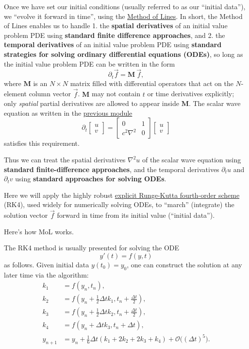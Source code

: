 \documentclass[landscape,letterpaper,10pt,english]{article}
\begin{document}
Once we have set our initial conditions (usually referred to as our
``initial data''), we ``evolve it forward in time'', using the
\href{https://reference.wolfram.com/language/tutorial/NDSolveMethodOfLines.html}{Method
of Lines}. In short, the Method of Lines enables us to handle 1. the
\textbf{spatial derivatives} of an initial value problem PDE using
\textbf{standard finite difference approaches}, and 2. the
\textbf{temporal derivatives} of an initial value problem PDE using
\textbf{standard strategies for solving ordinary differential equations
(ODEs)}, so long as the initial value problem PDE can be written in the
form \[\partial_t \vec{f} = \mathbf{M}\ \vec{f},\] where \(\mathbf{M}\)
is an \(N\times N\) matrix filled with differential operators that act
on the \(N\)-element column vector \(\vec{f}\). \(\mathbf{M}\) may not
contain \(t\) or time derivatives explicitly; only \emph{spatial}
partial derivatives are allowed to appear inside \(\mathbf{M}\). The
scalar wave equation as written in the
\href{Tutorial-ScalarWave.ipynb}{previous module} \begin{equation}
\partial_t 
\begin{bmatrix}
u \\
v 
\end{bmatrix}=
\begin{bmatrix}
0 & 1 \\
c^2 \nabla^2  & 0 
\end{bmatrix}
\begin{bmatrix}
u \\
v 
\end{bmatrix}
\end{equation} satisfies this requirement.

Thus we can treat the spatial derivatives \(\nabla^2 u\) of the scalar
wave equation using \textbf{standard finite-difference approaches}, and
the temporal derivatives \(\partial_t u\) and \(\partial_t v\) using
\textbf{standard approaches for solving ODEs}.

Here we will apply the highly robust
\href{https://en.wikipedia.org/wiki/Runge\%E2\%80\%93Kutta_methods}{explicit
Runge-Kutta fourth-order scheme} (RK4), used widely for numerically
solving ODEs, to ``march'' (integrate) the solution vector \(\vec{f}\)
forward in time from its initial value (``initial data'').

    Here's how MoL works.

The RK4 method is usually presented for solving the ODE \[
y'(t) = f(y,t)
\] as follows. Given initial data \(y(t_0)=y_0\), one can construct the
solution at any later time via the algorithm: \begin{align}
k_1 &= f(y_n, t_n), \\
k_2 &= f(y_n + \frac{1}{2}\Delta tk_1, t_n + \frac{\Delta t}{2}), \\
k_3 &= f(y_n + \frac{1}{2}\Delta tk_2, t_n + \frac{\Delta t}{2}), \\
k_4 &= f(y_n + \Delta tk_3, t_n + \Delta t), \\
y_{n+1} &= y_n + \frac{1}{6}\Delta t(k_1 + 2k_2 + 2k_3 + k_4) + \mathcal{O}\big((\Delta t)^5\big).
\end{align}
\end{document}
